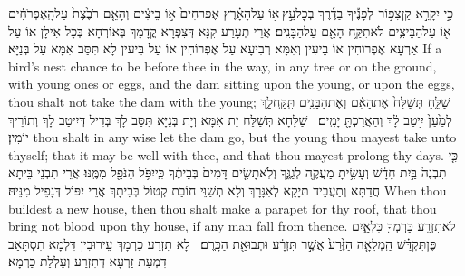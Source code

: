 \newseder
{}%
{כִּ֣י יִקָּרֵ֣א קַן\maqqaf צִפּ֣וֹר \pasek  לְפָנֶ֡יךָ בַּדֶּ֜רֶךְ בְּכׇל\maqqaf עֵ֣ץ \legarmeh  א֣וֹ עַל\maqqaf הָאָ֗רֶץ אֶפְרֹחִים֙ א֣וֹ בֵיצִ֔ים וְהָאֵ֤ם רֹבֶ֙צֶת֙ עַל\maqqaf הָֽאֶפְרֹחִ֔ים א֖וֹ עַל\maqqaf הַבֵּיצִ֑ים לֹא\maqqaf תִקַּ֥ח הָאֵ֖ם עַל\maqqaf הַבָּנִֽים׃}
{אֲרֵי תְעָרַע קִנָּא דְּצִפְּרָא קֳדָמָךְ בְּאוֹרְחָא בְּכָל אִילָן אוֹ עַל אַרְעָא אֶפְרוֹחִין אוֹ בֵיעִין וְאִמָּא רְבִיעָא עַל אֶפְרוֹחִין אוֹ עַל בֵּיעִין לָא תִּסַּב אִמָּא עַל בְּנַיָּא׃}
{If a bird’s nest chance to be before thee in the way, in any tree or on the ground, with young ones or eggs, and the dam sitting upon the young, or upon the eggs, thou shalt not take the dam with the young;}{}
{שַׁלֵּ֤חַ תְּשַׁלַּח֙ אֶת\maqqaf הָאֵ֔ם וְאֶת\maqqaf הַבָּנִ֖ים תִּֽקַּֽח\maqqaf לָ֑ךְ לְמַ֙עַן֙ יִ֣יטַב לָ֔ךְ וְהַאֲרַכְתָּ֖ יָמִֽים׃ \setuma }
{שַׁלָּחָא תְּשַׁלַּח יָת אִמָּא וְיָת בְּנַיָּא תִּסַּב לָךְ בְּדִיל דְּיִיטַב לָךְ וְתוֹרֵיךְ יוֹמִין׃}
{thou shalt in any wise let the dam go, but the young thou mayest take unto thyself; that it may be well with thee, and that thou mayest prolong thy days.}{}
{כִּ֤י תִבְנֶה֙ בַּ֣יִת חָדָ֔שׁ וְעָשִׂ֥יתָ מַעֲקֶ֖ה לְגַגֶּ֑ךָ וְלֹֽא\maqqaf תָשִׂ֤ים דָּמִים֙ בְּבֵיתֶ֔ךָ כִּֽי\maqqaf יִפֹּ֥ל הַנֹּפֵ֖ל מִמֶּֽנּוּ׃}
{אֲרֵי תִבְנֵי בֵּיתָא חֲדַתָּא וְתַעֲבֵיד תְּיָקָא לְאִגָּרָךְ וְלָא תְשַׁוֵּי חוֹבַת קְטוֹל בְּבֵיתָךְ אֲרֵי יִפּוֹל דְּנָפֵיל מִנֵּיהּ׃}
{When thou buildest a new house, then thou shalt make a parapet for thy roof, that thou bring not blood upon thy house, if any man fall from thence.}{}
{לֹא\maqqaf תִזְרַ֥ע כַּרְמְךָ֖ כִּלְאָ֑יִם פֶּן\maqqaf תִּקְדַּ֗שׁ הַֽמְלֵאָ֤ה הַזֶּ֙רַע֙ אֲשֶׁ֣ר תִּזְרָ֔ע וּתְבוּאַ֖ת הַכָּֽרֶם׃ \setuma }
{לָא תִזְרַע כַּרְמָךְ עֵירוּבִין דִּלְמָא תִסְתָּאַב דִּמְעַת זַרְעָא דְּתִזְרַע וְעַלְלַת כַּרְמָא׃}
